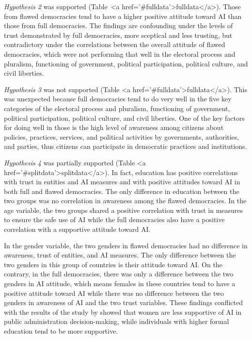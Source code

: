 \documentclass[
]{ceurart}
\begin{document}
\textit{Hypothesis 2} was supported 
(Table~<a href='#fulldata'>fulldata</a>). Those from flawed democracies tend to have a higher positive attitude toward AI than those from full democracies. The findings are confounding under the levels of trust demonstrated by full democracies, more sceptical and less trusting, but contradictory under the correlations between the overall attitude of flawed democracies, which were not performing that well in the electoral process and pluralism, functioning of government, political participation, political culture, and civil liberties.

\textit{Hypothesis 3} was not supported (Table <a href='#fulldata'>fulldata</a>). This was unexpected because full democracies tend to do very well in the five key categories of the electoral process and pluralism, functioning of government, political participation, political culture, and civil liberties. One of the key factors for doing well in those is the high level of awareness among citizens about policies, practices, services, and political activities by governments, authorities, and parties, thus citizens
can participate in democratic practices and institutions.

\textit{Hypothesis 4} was partially supported (Table <a href='#splitdata'>splitdata</a>). In fact, education has positive correlations with trust in entities and AI measures and with positive attitudes toward AI in both full and flawed democracies. The only difference in education between the two groups was no correlation in awareness among the flawed democracies. In the age variable, the two groups shared a positive correlation with trust in measures to ensure the safe use of AI while the full democracies also have a positive correlation with a supportive attitude toward AI.

In the gender variable, the two genders in flawed democracies had no difference in awareness, trust of entities, and AI measures. The only difference between the two genders in this group of countries is their attitude toward AI. On the contrary, in the full democracies, there was only a difference between the two genders in AI attitude, which means females in these countries tend to have a positive attitude toward AI while there was no difference between the two genders in awareness of AI and the two trust variables. These findings conflicted with the results of the study by \cite{konig2022citizen} showed that women are less supportive of AI in public administration decision-making, while individuals with higher formal education tend to be more supportive.
\end{document}
